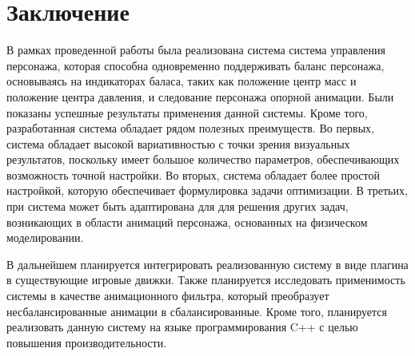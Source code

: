 \section{Заключение}

В рамках проведенной работы была реализована система система управления персонажа, которая способна одновременно поддерживать баланс персонажа, основываясь на индикаторах баласа, таких как положение центр масс и положение центра давления, и следование персонажа опорной анимации. Были показаны успешные результаты применения данной системы. Кроме того, разработанная система обладает рядом полезных преимуществ. Во первых, система обладает высокой вариативностью с точки зрения визуальных результатов, поскольку имеет большое количество параметров, обеспечивающих возможность точной настройки. Во вторых, система обладает более простой настройкой, которую обеспечивает формулировка задачи оптимизации. В третьих, при система может быть адаптирована для для решения других задач, возникающих в области анимаций персонажа, основанных на физическом моделировании.

В дальнейшем планируется интегрировать реализованную систему в виде плагина в существующие игровые движки. Также планируется исследовать применимость системы в качестве анимационного фильтра, который преобразует несбалансированные анимации в сбалансированные. Кроме того, планируется реализовать данную систему на языке программирования C++ с целью повышения производительности.

